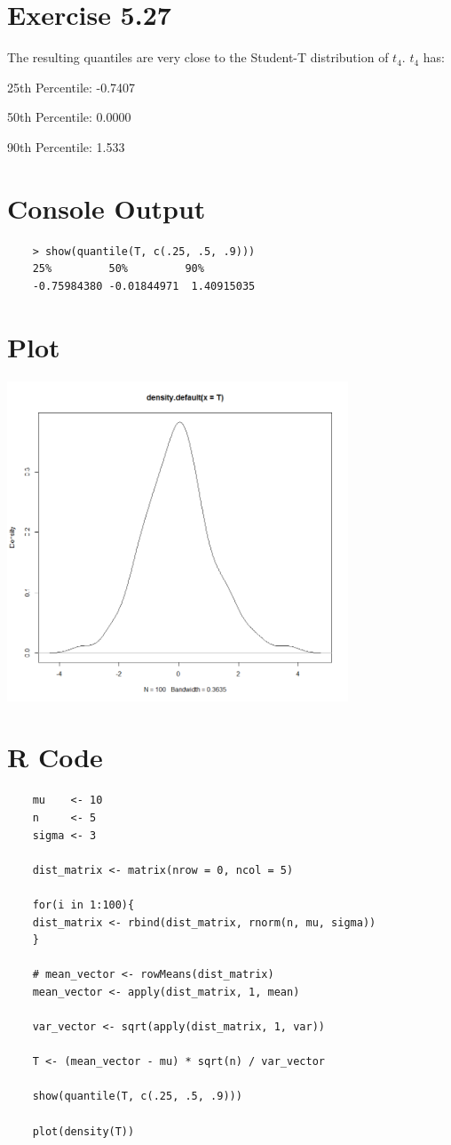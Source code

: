 \documentclass{article}
\begin{document}
	\section*{Exercise 5.27}
	The resulting quantiles are very close to the Student-T distribution of $t_{4}$. $t_4$ has:
	
	
	25th Percentile: -0.7407
	
	50th Percentile: 0.0000
	
	90th Percentile: 1.533
	
	\section*{Console Output}
	\begin{verbatim}
	> show(quantile(T, c(.25, .5, .9)))
	25%         50%         90% 
	-0.75984380 -0.01844971  1.40915035 
	\end{verbatim}
	\section*{Plot}
	\includegraphics[width=4in]{q4}
	\section*{R Code}
	\begin{verbatim}
	mu    <- 10
	n     <- 5
	sigma <- 3
	
	dist_matrix <- matrix(nrow = 0, ncol = 5)
	
	for(i in 1:100){
	dist_matrix <- rbind(dist_matrix, rnorm(n, mu, sigma))
	}
	
	# mean_vector <- rowMeans(dist_matrix)
	mean_vector <- apply(dist_matrix, 1, mean)
	
	var_vector <- sqrt(apply(dist_matrix, 1, var))
	
	T <- (mean_vector - mu) * sqrt(n) / var_vector
	
	show(quantile(T, c(.25, .5, .9)))
	
	plot(density(T))
	\end{verbatim}
\end{document}
